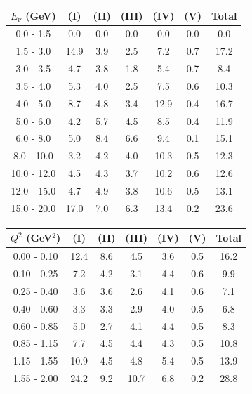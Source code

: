 \documentclass[aps, prd, reprint,showpacs,  preprintnumbers,amsmath,amssymb,superscriptaddress, nofootinbib]{revtex4-1}
\makeatletter
\renewenvironment{table}
  {\def\@captype{table}}
  {}
\makeatother
\begin{document}
\vspace{0.5cm}

\begin{table}
\centering
\begin{tabular}{ccccccc}
\hline
$E_{\nu}$ (GeV) & (I) & (II) & (III) & (IV) & (V) & Total \\
\hline
     0.0 - 1.5 &  0.0 &  0.0 &  0.0 &  0.0 &  0.0 &  0.0 \\
     1.5 - 3.0 & 14.9 &  3.9 &  2.5 &  7.2 &  0.7 & 17.2 \\
     3.0 - 3.5 &  4.7 &  3.8 &  1.8 &  5.4 &  0.7 &  8.4 \\
     3.5 - 4.0 &  5.3 &  4.0 &  2.5 &  7.5 &  0.6 & 10.3 \\
     4.0 - 5.0 &  8.7 &  4.8 &  3.4 & 12.9 &  0.4 & 16.7 \\
     5.0 - 6.0 &  4.2 &  5.7 &  4.5 &  8.5 &  0.4 & 11.9 \\
     6.0 - 8.0 &  5.0 &  8.4 &  6.6 &  9.4 &  0.1 & 15.1 \\
    8.0 - 10.0 &  3.2 &  4.2 &  4.0 & 10.3 &  0.5 & 12.3 \\
   10.0 - 12.0 &  4.5 &  4.3 &  3.7 & 10.2 &  0.6 & 12.6 \\
   12.0 - 15.0 &  4.7 &  4.9 &  3.8 & 10.6 &  0.5 & 13.1 \\
   15.0 - 20.0 & 17.0 &  7.0 &  6.3 & 13.4 &  0.2 & 23.6 \\
\hline\hline
\end{tabular}
\caption{Fractional systematic uncertainties (in percent) for $\sigma(E_\nu)$.}
\label{tb:syst-Ev-xsec}
\end{table}

\vspace{0.5cm}

\begin{table}
\centering
\begin{tabular}{ccccccc}
\hline
$Q^{2}$ (GeV$^{2}$) & (I) & (II) & (III) & (IV) & (V) & Total \\
\hline
   0.00 - 0.10 & 12.4 &  8.6 &  4.5 &  3.6 &  0.5 & 16.2 \\
   0.10 - 0.25 &  7.2 &  4.2 &  3.1 &  4.4 &  0.6 &  9.9 \\
   0.25 - 0.40 &  3.6 &  3.6 &  2.6 &  4.1 &  0.6 &  7.1 \\
   0.40 - 0.60 &  3.3 &  3.3 &  2.9 &  4.0 &  0.5 &  6.8 \\
   0.60 - 0.85 &  5.0 &  2.7 &  4.1 &  4.4 &  0.5 &  8.3 \\
   0.85 - 1.15 &  7.7 &  4.5 &  4.4 &  4.3 &  0.5 & 10.8 \\
   1.15 - 1.55 & 10.9 &  4.5 &  4.8 &  5.4 &  0.5 & 13.9 \\
   1.55 - 2.00 & 24.2 &  9.2 & 10.7 &  6.8 &  0.2 & 28.8 \\
\hline\hline
\end{tabular}
\caption{Fractional systematic uncertainties (in percent) for $d\sigma/dQ^2$.}
\label{tb:syst-Q2}
\end{table}
\end{document}

